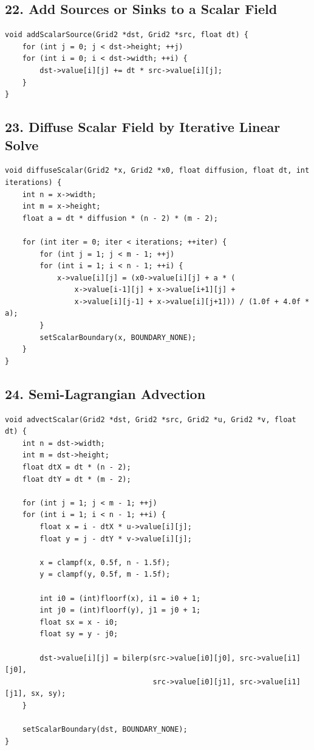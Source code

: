 \documentclass[10pt,letterpaper]{article}
\begin{document}
\subsection*{22. Add Sources or Sinks to a Scalar Field}

\begin{verbatim}
void addScalarSource(Grid2 *dst, Grid2 *src, float dt) {
    for (int j = 0; j < dst->height; ++j)
    for (int i = 0; i < dst->width; ++i) {
        dst->value[i][j] += dt * src->value[i][j];
    }
}
\end{verbatim}

\subsection*{23. Diffuse Scalar Field by Iterative Linear Solve}

\begin{verbatim}
void diffuseScalar(Grid2 *x, Grid2 *x0, float diffusion, float dt, int iterations) {
    int n = x->width;
    int m = x->height;
    float a = dt * diffusion * (n - 2) * (m - 2);

    for (int iter = 0; iter < iterations; ++iter) {
        for (int j = 1; j < m - 1; ++j)
        for (int i = 1; i < n - 1; ++i) {
            x->value[i][j] = (x0->value[i][j] + a * (
                x->value[i-1][j] + x->value[i+1][j] +
                x->value[i][j-1] + x->value[i][j+1])) / (1.0f + 4.0f * a);
        }
        setScalarBoundary(x, BOUNDARY_NONE);
    }
}
\end{verbatim}

\subsection*{24. Semi-Lagrangian Advection}

\begin{verbatim}
void advectScalar(Grid2 *dst, Grid2 *src, Grid2 *u, Grid2 *v, float dt) {
    int n = dst->width;
    int m = dst->height;
    float dtX = dt * (n - 2);
    float dtY = dt * (m - 2);

    for (int j = 1; j < m - 1; ++j)
    for (int i = 1; i < n - 1; ++i) {
        float x = i - dtX * u->value[i][j];
        float y = j - dtY * v->value[i][j];

        x = clampf(x, 0.5f, n - 1.5f);
        y = clampf(y, 0.5f, m - 1.5f);

        int i0 = (int)floorf(x), i1 = i0 + 1;
        int j0 = (int)floorf(y), j1 = j0 + 1;
        float sx = x - i0;
        float sy = y - j0;

        dst->value[i][j] = bilerp(src->value[i0][j0], src->value[i1][j0],
                                  src->value[i0][j1], src->value[i1][j1], sx, sy);
    }

    setScalarBoundary(dst, BOUNDARY_NONE);
}
\end{verbatim}
\end{document}
